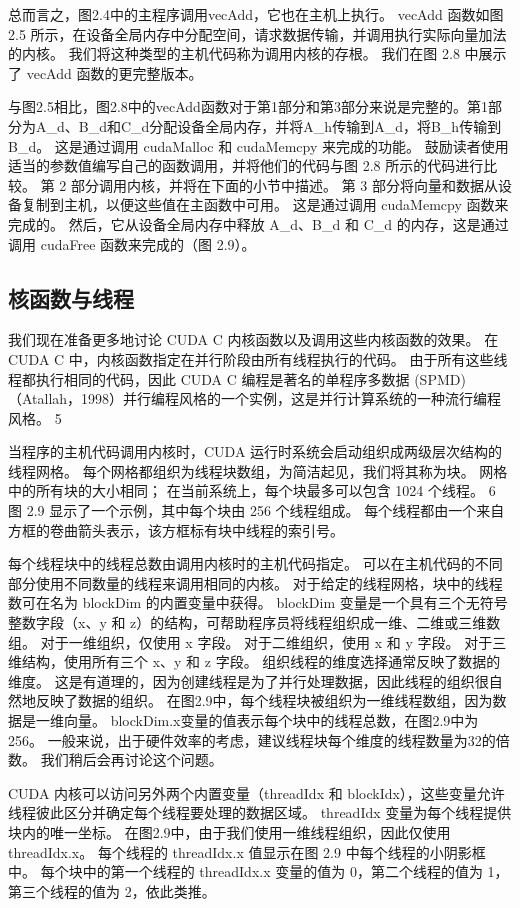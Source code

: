 总而言之，图2.4中的主程序调用vecAdd，它也在主机上执行。 vecAdd 函数如图 2.5 所示，在设备全局内存中分配空间，请求数据传输，并调用执行实际向量加法的内核。 我们将这种类型的主机代码称为调用内核的存根。 我们在图 2.8 中展示了 vecAdd 函数的更完整版本。

与图2.5相比，图2.8中的vecAdd函数对于第1部分和第3部分来说是完整的。第1部分为A\_d、B\_d和C\_d分配设备全局内存，并将A\_h传输到A\_d，将B\_h传输到B\_d。 这是通过调用 cudaMalloc 和 cudaMemcpy 来完成的功能。 鼓励读者使用适当的参数值编写自己的函数调用，并将他们的代码与图 2.8 所示的代码进行比较。 第 2 部分调用内核，并将在下面的小节中描述。 第 3 部分将向量和数据从设备复制到主机，以便这些值在主函数中可用。 这是通过调用 cudaMemcpy 函数来完成的。 然后，它从设备全局内存中释放 A\_d、B\_d 和 C\_d 的内存，这是通过调用 cudaFree 函数来完成的（图 2.9）。

\subsection{核函数与线程}
我们现在准备更多地讨论 CUDA C 内核函数以及调用这些内核函数的效果。 在 CUDA C 中，内核函数指定在并行阶段由所有线程执行的代码。 由于所有这些线程都执行相同的代码，因此 CUDA C 编程是著名的单程序多数据 (SPMD)（Atallah，1998）并行编程风格的一个实例，这是并行计算系统的一种流行编程风格。 5

当程序的主机代码调用内核时，CUDA 运行时系统会启动组织成两级层次结构的线程网格。 每个网格都组织为线程块数组，为简洁起见，我们将其称为块。 网格中的所有块的大小相同； 在当前系统上，每个块最多可以包含 1024 个线程。 6 图 2.9 显示了一个示例，其中每个块由 256 个线程组成。 每个线程都由一个来自方框的卷曲箭头表示，该方框标有块中线程的索引号。

每个线程块中的线程总数由调用内核时的主机代码指定。 可以在主机代码的不同部分使用不同数量的线程来调用相同的内核。 对于给定的线程网格，块中的线程数可在名为 blockDim 的内置变量中获得。 blockDim 变量是一个具有三个无符号整数字段（x、y 和 z）的结构，可帮助程序员将线程组织成一维、二维或三维数组。 对于一维组织，仅使用 x 字段。 对于二维组织，使用 x 和 y 字段。 对于三维结构，使用所有三个 x、y 和 z 字段。 组织线程的维度选择通常反映了数据的维度。 这是有道理的，因为创建线程是为了并行处理数据，因此线程的组织很自然地反映了数据的组织。 在图2.9中，每个线程块被组织为一维线程数组，因为数据是一维向量。 blockDim.x变量的值表示每个块中的线程总数，在图2.9中为256。 一般来说，出于硬件效率的考虑，建议线程块每个维度的线程数量为32的倍数。 我们稍后会再讨论这个问题。

CUDA 内核可以访问另外两个内置变量（threadIdx 和 blockIdx），这些变量允许线程彼此区分并确定每个线程要处理的数据区域。 threadIdx 变量为每个线程提供块内的唯一坐标。 在图2.9中，由于我们使用一维线程组织，因此仅使用threadIdx.x。 每个线程的 threadIdx.x 值显示在图 2.9 中每个线程的小阴影框中。 每个块中的第一个线程的 threadIdx.x 变量的值为 0，第二个线程的值为 1，第三个线程的值为 2，依此类推。

